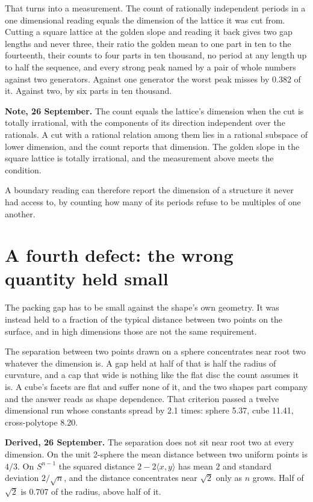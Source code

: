 That turns into a measurement. The count of rationally independent periods in a one dimensional
reading equals the dimension of the lattice it was cut from. Cutting a square lattice at the golden
slope and reading it back gives two gap lengths and never three, their ratio the golden mean to one
part in ten to the fourteenth, their counts to four parts in ten thousand, no period at any length
up to half the sequence, and every strong peak named by a pair of whole numbers against two
generators. Against one generator the worst peak misses by 0.382 of it. Against two, by six parts in
ten thousand.

\textbf{Note, 26 September.} The count equals the lattice's dimension when the cut is totally irrational, with the components of its direction independent over the rationals. A cut with a rational relation among them lies in a rational subspace of lower dimension, and the count reports that dimension. The golden slope in the square lattice is totally irrational, and the measurement above meets the condition.

A boundary reading can therefore report the dimension of a structure it never had access to, by counting
how many of its periods refuse to be multiples of one another.

\section{A fourth defect: the wrong quantity held small}

The packing gap has to be small against the shape's own geometry. It was instead held to a fraction
of the typical distance between two points on the surface, and in high dimensions those are not the
same requirement.

The separation between two points drawn on a sphere concentrates near root two whatever the
dimension is. A gap held at half of that is half the radius of curvature, and a cap that wide is
nothing like the flat disc the count assumes it is. A cube's facets are flat and suffer none of it,
and the two shapes part company and the answer reads as shape dependence. That criterion passed a
twelve dimensional run whose constants spread by 2.1 times: sphere 5.37, cube 11.41, cross-polytope
8.20.

\textbf{Derived, 26 September.} The separation does not sit near root two at every dimension. On the unit 2-sphere the mean distance between two uniform points is $4/3$. On $S^{n-1}$ the squared distance $2 - 2\langle x, y\rangle$ has mean $2$ and standard deviation $2/\sqrt{n}$, and the distance concentrates near $\sqrt{2}$ only as $n$ grows. Half of $\sqrt{2}$ is $0.707$ of the radius, above half of it.

